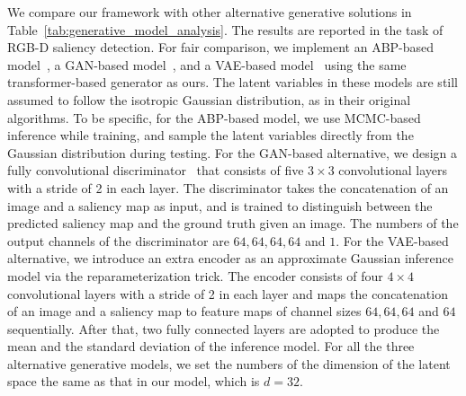 \documentclass{article}
\begin{document}
We compare our framework with other alternative generative solutions in Table~\ref{tab:generative_model_analysis}. The results are reported in the task of RGB-D saliency detection. For fair comparison, we implement an ABP-based model~\cite{abp}, a GAN-based model~\cite{GAN_nips}, and a VAE-based model~\cite{vae_bayes_kumar,structure_output} using the same transformer-based generator as ours. The latent variables in these models are still assumed to follow the isotropic Gaussian distribution, as in their original algorithms. 
To be specific, for the ABP-based model, we use MCMC-based inference while training, and sample the latent variables directly from the Gaussian distribution during testing.
For the GAN-based alternative, we design a fully convolutional discriminator~\cite{hung2018adversarial} that consists of five $3\times3$ convolutional layers with a stride of 2 in each layer. The discriminator takes the concatenation of an image and a saliency map as input, and is trained to distinguish between the predicted saliency map and the ground truth given an image. The numbers of the output channels of the discriminator are $64,64,64,64$ and $1$. For the VAE-based alternative, we introduce an extra encoder as an approximate Gaussian inference model via the reparameterization trick. The encoder consists of four $4\times4$ convolutional layers with a stride of 2 in each layer and maps the concatenation of an image and a saliency map to feature maps of channel sizes $64,64,64$ and $64$ sequentially. After that, two fully connected layers are adopted to produce the mean and the standard deviation of the inference model.
For all the three alternative generative models, we set the numbers of the dimension of the latent space the same as that in our model, which is $d=32$. 
\end{document}
